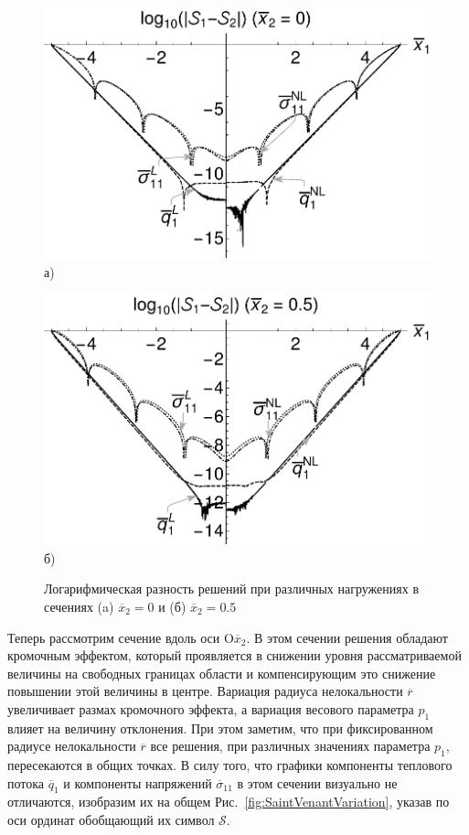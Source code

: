 \begin{figure}[ht]
    \begin{minipage}[b][][b]{0.49\linewidth}\centering
        \includegraphics[width=\linewidth]{pics/StabilityLogX0.pdf} \\ а)
    \end{minipage}
    \hfill
    \begin{minipage}[b][][b]{0.49\linewidth}\centering
        \includegraphics[width=\linewidth]{pics/StabilityLogX05.pdf} \\ б)
    \end{minipage}
    \caption{Логарифмическая разность решений при различных нагружениях в сечениях (a) $\overline{x}_2 = 0$ и (б) $\overline{x}_2 = 0.5$}
    \label{fig:StabilityLog10}
\end{figure}

Теперь рассмотрим сечение вдоль оси $\text{O}\overline{x}_2$. В этом сечении решения обладают кромочным эффектом, который проявляется в снижении уровня рассматриваемой величины на свободных границах области и компенсирующим это снижение повышении этой величины в центре. Вариация радиуса нелокальности $\overline{r}$ увеличивает размах кромочного эффекта, а вариация весового параметра $p_1$ влияет на величину отклонения. При этом заметим, что при фиксированном радиусе нелокальности $\overline{r}$ все решения, при различных значениях параметра $p_1$, пересекаются в общих точках. В силу того, что графики компоненты теплового потока $\overline{q}_1$ и компоненты напряжений $\overline{\sigma}_{11}$ в этом сечении визуально не отличаются, изобразим их на общем Рис.~\ref{fig:SaintVenantVariation}, указав по оси ординат обобщающий их символ $\mathcal{S}$.

